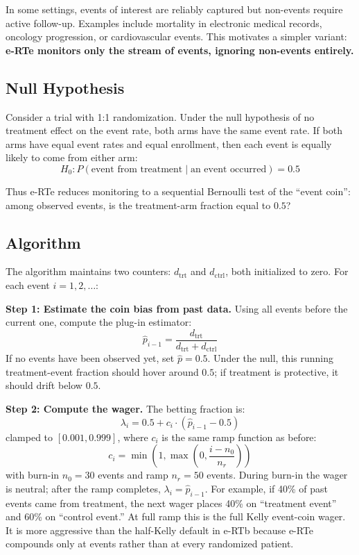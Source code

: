 \documentclass[10pt]{article}
\begin{document}
In some settings, events of interest are reliably captured but non-events require active follow-up. Examples include mortality in electronic medical records, oncology progression, or cardiovascular events. This motivates a simpler variant: \textbf{e-RTe monitors only the stream of events, ignoring non-events entirely.}

\subsection{Null Hypothesis}

Consider a trial with 1:1 randomization. Under the null hypothesis of no treatment effect on the event rate, both arms have the same event rate. If both arms have equal event rates and equal enrollment, then each event is equally likely to come from either arm:
\begin{equation}
H_0: P(\text{event from treatment} \mid \text{an event occurred}) = 0.5
\end{equation}

Thus e-RTe reduces monitoring to a sequential Bernoulli test of the ``event coin'': among observed events, is the treatment-arm fraction equal to $0.5$?

\subsection{Algorithm}

The algorithm maintains two counters: $d_{\text{trt}}$ and $d_{\text{ctrl}}$, both initialized to zero. For each event $i = 1, 2, \ldots$:

\textbf{Step 1: Estimate the coin bias from past data.} Using all events before the current one, compute the plug-in estimator:
\begin{equation}
\hat{p}_{i-1} = \frac{d_{\text{trt}}}{d_{\text{trt}} + d_{\text{ctrl}}}
\end{equation}
If no events have been observed yet, set $\hat{p} = 0.5$. Under the null, this running treatment-event fraction should hover around $0.5$; if treatment is protective, it should drift below $0.5$.

\textbf{Step 2: Compute the wager.} The betting fraction is:
\begin{equation}
\lambda_i = 0.5 + c_i \cdot (\hat{p}_{i-1} - 0.5)
\end{equation}
clamped to $[0.001, 0.999]$, where $c_i$ is the same ramp function as before:
\begin{equation}
c_i = \min\left(1, \max\left(0, \frac{i - n_0}{n_r}\right)\right)
\end{equation}
with burn-in $n_0 = 30$ events and ramp $n_r = 50$ events. During burn-in the wager is neutral; after the ramp completes, $\lambda_i = \hat{p}_{i-1}$. For example, if 40\% of past events came from treatment, the next wager places 40\% on ``treatment event'' and 60\% on ``control event.'' At full ramp this is the full Kelly event-coin wager. It is more aggressive than the half-Kelly default in e-RTb because e-RTe compounds only at events rather than at every randomized patient.
\end{document}

